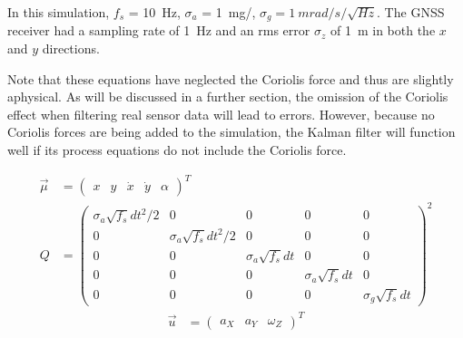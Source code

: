 \documentclass[10pt]{article}
\begin{document}
In this simulation, $f_s$ = \SI{10}{Hz}, $\sigma_a$ = \SI{1}{mg/}, $\sigma_g = \SI{1}{mrad/s/\sqrt{Hz}}$. The GNSS receiver had a sampling rate of \SI{1}{Hz} and an rms error $\sigma_z$ of \SI{1}{m} in both the $x$ and $y$ directions.

Note that these equations have neglected the Coriolis force and thus are slightly aphysical. As will be discussed in a further section, the omission of the Coriolis effect when filtering real sensor data will lead to errors. However, because no Coriolis forces are being added to the simulation, the Kalman filter will function well if its process equations do not include the Coriolis force.

\begin{align}
\vec{\mu} &= \begin{pmatrix} x & y & \dot{x} & \dot{y} & \alpha \end{pmatrix}^T \\
  Q & = \begin{pmatrix}
    \sigma_a \sqrt{f_s} dt^2/2 & 0 & 0 & 0 & 0 \\
    0 & \sigma_a \sqrt{f_s} dt^2/2 & 0 & 0 & 0 \\    
    0& 0 & \sigma_a \sqrt{f_s} dt & 0 & 0\\
    0 & 0 & 0 & \sigma_a \sqrt{f_s} dt & 0 \\
    0 & 0 & 0 & 0 &  \sigma_g \sqrt{f_s} dt 
  \end{pmatrix}^2 
\end{align}
\begin{align}
  \vec{u} &= \begin{pmatrix}
    a_X & a_Y & \omega_Z
  \end{pmatrix}^T 
\end{align}
\end{document}
